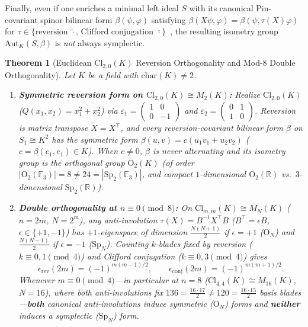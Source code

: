 \documentclass[11pt,a4paper]{article}
\newcommand{\smat}[4]{\left(\begin{smallmatrix}#1&#2\\#3&#4\end{smallmatrix}\right)}
\newtheorem{theorem}{Theorem}[section]
\theoremstyle{definition}
\newcommand{\Cl}{\mathrm{Cl}}
\newcommand{\Aut}{\mathrm{Aut}}
\newcommand{\Sp}{\mathrm{Sp}}
\newcommand{\Orth}{\mathrm{O}}
\begin{document}
Finally, even if one enriches a minimal left ideal $S$ with its canonical $\mathrm{Pin}$-covariant spinor bilinear form $\beta(\psi, \varphi)$ satisfying $\beta(X\psi, \varphi) = \beta(\psi, \tau(X)\varphi)$ for $\tau \in \{\text{reversion } \widetilde{\cdot},\, \text{Clifford conjugation } \overline{\cdot}\}$~\cite{Porteous1995,Lounesto2001}, the resulting isometry group $\Aut_K(S, \beta)$ is \emph{not} always symplectic.

\begin{theorem}[Euclidean $\Cl_{2,0}(K)$ Reversion Orthogonality and Mod-$8$ Double Orthogonality]\label{thm:mod8}
Let $K$ be a field with $\mathrm{char}(K) \neq 2$.
\begin{enumerate}
  \item[(1)] \textbf{Symmetric reversion form on $\Cl_{2,0}(K) \cong M_2(K)$:} Realize $\Cl_{2,0}(K)$ ($Q(x_1, x_2) = x_1^2 + x_2^2$) via $\varepsilon_1 = \smat{1}{0}{0}{-1}$ and $\varepsilon_2 = \smat{0}{1}{1}{0}$. Reversion is matrix transpose $\widetilde{X} = X^\top$, and \emph{every} reversion-covariant bilinear form $\beta$ on $S_1 \cong K^2$ has the symmetric form $\beta(u, v) = c(u_1 v_1 + u_2 v_2)$ ($c = \beta(e_1, e_1) \in K$). When $c \neq 0$, $\beta$ is never alternating and its isometry group is the orthogonal group $\Orth_2(K)$ (of order $|\Orth_2(\mathbb{F}_3)| = 8 \neq 24 = |\Sp_2(\mathbb{F}_3)|$, and compact $1$-dimensional $\Orth_2(\mathbb{R})$ vs.\ $3$-dimensional $\Sp_2(\mathbb{R})$).
  \item[(2)] \textbf{Double orthogonality at $n \equiv 0 \pmod{8}$:} On $\Cl_{m,m}(K) \cong M_N(K)$ ($n = 2m$, $N = 2^m$), any anti-involution $\tau(X) = B^{-1} X^\top B$ ($B^\top = \epsilon B$, $\epsilon \in \{+1, -1\}$) has $+1$-eigenspace of dimension $\frac{N(N+1)}{2}$ if $\epsilon = +1$ ($\Orth_N$) and $\frac{N(N-1)}{2}$ if $\epsilon = -1$ ($\Sp_N$). Counting $k$-blades fixed by reversion ($k \equiv 0, 1 \pmod 4$) and Clifford conjugation ($k \equiv 0, 3 \pmod 4$) gives
  \[
    \epsilon_{\mathrm{rev}}(2m) = (-1)^{m(m-1)/2}, \qquad \epsilon_{\mathrm{conj}}(2m) = (-1)^{m(m+1)/2}.
  \]
  Whenever $m \equiv 0 \pmod{4}$---in particular at $n = 8$ ($\Cl_{4,4}(K) \cong M_{16}(K)$, $N = 16$), where both anti-involutions fix $136 = \frac{16 \cdot 17}{2} \neq 120 = \frac{16 \cdot 15}{2}$ basis blades---\textbf{both} canonical anti-involutions induce symmetric ($\Orth_N$) forms and \textbf{neither} induces a symplectic ($\Sp_N$) form.
\end{enumerate}
\end{theorem}
\end{document}
